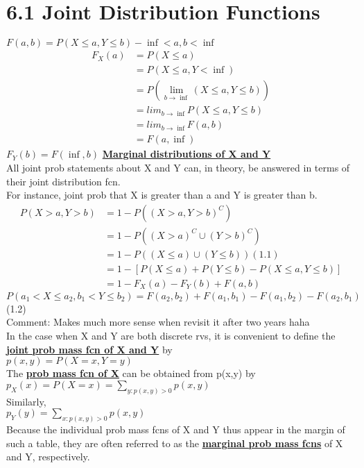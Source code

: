 \documentclass{article}
\begin{document}
\section*{6.1 Joint Distribution Functions}
$F(a,b) = P(X \leq a, Y \leq b) -\inf < a, b < \inf$ 
\begin{align*}
F_X(a)  &= P(X \leq a) \\ 
        &= P(X \leq a, Y < \inf) \\ 
        &= P(\lim_{b \rightarrow \inf}(X \leq a, Y \leq b)) \\ 
        &= lim_{b \rightarrow \inf} P(X \leq a, Y \leq b) \\ 
        &= lim_{b \rightarrow \inf} F(a,b) \\ 
        &= F(a, \inf)
\end{align*}
$ F_Y(b) = F(\inf, b)$ \underline{\textbf{Marginal distributions of X and Y}} \\ 
All joint prob statements about X and Y can, in theory, be answered in terms of their joint distribution fcn. \\
For instance, joint prob that X is greater than a and Y is greater than b. 
\begin{align*}
P(X>a, Y>b) &= 1- P((X > a, Y > b)^C) \\ 
            &= 1- P((X > a)^C \cup (Y > b)^C) \\
            &= 1 - P((X \leq a) \cup (Y \leq b))  (1.1) \\
            &= 1 - [P(X \leq a) + P(Y \leq b) - P(X \leq a, Y \leq b)]\\
            &= 1 - F_X(a) - F_Y(b) + F(a,b) 
\end{align*}
$P(a_1 < X \leq a_2, b_1 < Y \leq b_2) = F(a_2, b_2) + F(a_1, b_1) - F(a_1, b_2) - F(a_2, b_1)$ (1.2)\\ 
Comment: Makes much more sense when revisit it after two years haha \\ 
In the case when X and Y are both discrete rvs, it is convenient to define the \underline{\textbf{joint prob mass fcn of X and Y}} by \\
$p(x,y) = P(X=x, Y=y)$ \\
The \underline{\textbf{prob mass fcn of X}} can be obtained from p(x,y) by \\
$ p_X(x) = P(X=x) = \sum_{y:p(x,y) > 0}p(x,y)$ \\
Similarly, \\
$ p_Y(y) = \sum_{x:p(x,y) > 0}p(x,y)$\\
Because the individual prob mass fcns of X and Y thus appear in the margin of such a table, they are often referred to as the \underline{\textbf{marginal prob mass fcns}} of X and Y, respectively. \\
\end{document}
